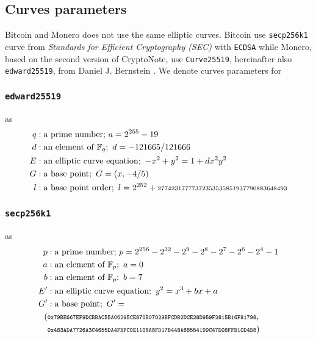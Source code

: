 \documentclass{llncs}
\begin{document}
\subsection{Curves parameters}
\label{curveParams}
Bitcoin and Monero does not use the same elliptic curves. Bitcoin use \texttt{secp256k1} curve from \textit{Standards for Efficient Cryptography (SEC)} with \texttt{ECDSA} while Monero, based on the second version of CryptoNote, use \texttt{Curve25519}, hereinafter also \texttt{edward25519}, from Daniel J. Bernstein \cite{CerRes10, van2013cryptonote}. We denote curves parameters for

\subsubsection{\texttt{edward25519}} as
\begin{equation}
\begin{split}
    q&: \text{a prime number;}\ a = 2^{255} - 19 \\
    d&: \text{an element of } \mathbb{F}_q;\ d = - 121665/121666 \\
    E&: \text{an elliptic curve equation};\ -x^2 + y^2 = 1 + dx^2y^2 \\
    G&: \text{a base point};\ G = (x, -4/5) \\
    l&: \text{a base point order};\ l = 2^{252} + \scriptsize\text{27742317777372353535851937790883648493} \\
\end{split}
\end{equation}

\subsubsection{\texttt{secp256k1}} as
\begin{equation}
\begin{split}
    p&: \text{a prime number;}\ p = 2^{256} - 2^{32} - 2^9 - 2^8 - 2^7 - 2^6 - 2^4 - 1 \\
    a&: \text{an element of } \mathbb{F}_p;\ a = 0 \\
    b&: \text{an element of } \mathbb{F}_p;\ b = 7 \\
    E'&: \text{an elliptic curve equation};\ y^2 = x^3 + bx + a \\
    G'&: \text{a base point};\ G' = \\ (&\scriptsize\texttt{0x79BE667EF9DCBBAC55A06295CE870B07029BFCDB2DCE28D959F2815B16F81798},\\ &\scriptsize\texttt{0x483ADA7726A3C4655DA4FBFC0E1108A8FD17B448A68554199C47D08FFB10D4B8}) \\
\end{split}
\end{equation}
\end{document}
